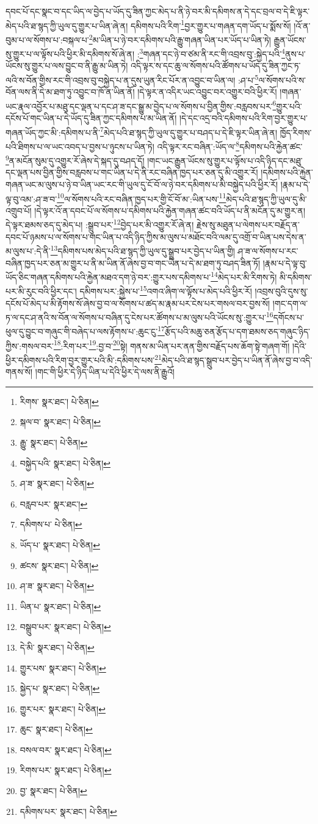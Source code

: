 དབང་པོ་དང་སྣང་བ་དང་ཡིད་ལ་བྱེད་པ་ཡོད་དུ་ཟིན་ཀྱང་མེད་པ་ནི་ཉེ་བར་མི་དམིགས་ན་དེ་དང་བྲལ་བ་དེ་ཇི་ལྟར་མེད་པའི་ཐ་སྙད་ཀྱི་ཡུལ་དུ་གྱུར་པ་ཡིན་ཞེ་ན། དམིགས་པའི་རིག་\footnote{རིགས་  སྣར་ཐང་།  པེ་ཅིན། }བྱར་གྱུར་པ་གཞན་དག་ཡོད་པ་སྨོས་སོ། །འོ་ན་བུམ་པ་ལ་སོགས་པ་:བསྐལ་པ་\footnote{སྐལ་བ་  སྣར་ཐང་།  པེ་ཅིན། }མ་ཡིན་པ་ཉེ་བར་དམིགས་པའི་རྒྱུ་གཞན་ཡིན་པར་ཡོད་པ་ཡིན་ཏེ། རྒྱུན་ཡོངས་སུ་གྱུར་པ་ལ་ལྟོས་པའི་ཕྱིར་མི་དམིགས་སོ་ཞེ་ན། :\footnote{རྒྱུ་  སྣར་ཐང་།  པེ་ཅིན། }གཞན་དང་ཉེ་བ་ཙམ་ནི་རང་གི་འབྲས་བུ་:སྐྱེད་པའི་\footnote{བསྐྱེད་པའི་  སྣར་ཐང་།  པེ་ཅིན། }ནུས་པ་ཡོངས་སུ་གྱུར་པ་ལས་བྱུང་བ་ནི་རྒྱུ་མ་ཡིན་ཏེ། འདི་ལྟར་ས་དང་ཆུ་ལ་སོགས་པའི་ཚོགས་པ་ཡོད་དུ་ཟིན་ཀྱང་ཏ་ལའི་ས་བོན་གྱིས་རང་གི་འབྲས་བུ་བསྐྱེད་པ་ན་དུས་ཡུན་རིང་པོར་ན་འབྱུང་བ་ཡིན་ལ། :ཤ་པ་\footnote{ཤ་ཟ་  སྣར་ཐང་།  པེ་ཅིན། }ལ་སོགས་པའི་ས་བོན་ལས་ནི་དེ་མ་ཐག་ཏུ་འབྱུང་བ་ཁོ་ན་ཡིན་ནོ། །དེ་ལྟར་ན་འདིར་ཡང་འབྱུང་བར་འགྱུར་བའི་ཕྱིར་རོ། །གཞན་ཡང་རྣལ་འབྱོར་པ་མཐུ་དང་ལྡན་པ་དང་ཤ་ཟ་དང་སྒྱུ་མ་བྱེད་པ་ལ་སོགས་པ་བྱིན་གྱིས་:བརླབས་པར་\footnote{བརླབ་པར་  སྣར་ཐང་། }གྱུར་པའི་དངོས་པོ་གང་ཡིན་པ་དེ་ཡོད་དུ་ཟིན་ཀྱང་དམིགས་པ་མ་ཡིན་ནོ། །དེ་དང་འདྲ་བའི་དམིགས་པའི་རིག་བྱར་གྱུར་པ་གཞན་ཡོད་ཀྱང་མི་:དམིགས་པ་ནི་\footnote{དམིགས་པ་  པེ་ཅིན། }མེད་པའི་ཐ་སྙད་ཀྱི་ཡུལ་དུ་གྱུར་པ་བཤད་པ་དེ་ཇི་ལྟར་ཡིན་ཞེ་ན། ཁྱོད་རིགས་པའི་ཐིགས་པ་ལ་ཡང་འབད་པ་བྱས་པ་ཉུངས་པ་ཡིན་ཏེ། འདི་ལྟར་རང་བཞིན་:ཡོད་ལ་\footnote{ཡོད་པ་  སྣར་ཐང་།  པེ་ཅིན། }དམིགས་པའི་རྐྱེན་ཚང་\footnote{ཚངས་  སྣར་ཐང་།  པེ་ཅིན། }ན་མངོན་སུམ་དུ་འགྱུར་རོ་ཞེས་དེ་སྐད་དུ་བཤད་དོ། །གང་ཡང་རྒྱུན་ཡོངས་སུ་གྱུར་པ་ལྟོས་པ་འདི་ཉིད་དང་མཐུ་དང་ལྡན་པས་བྱིན་གྱིས་བརླབས་པ་གང་ཡིན་པ་དེ་ནི་རང་བཞིན་ཁྱད་པར་ཅན་དུ་མི་འགྱུར་རོ། །དམིགས་པའི་རྐྱེན་གཞན་ཡང་མ་ལུས་པ་ཉེ་བ་ཡིན་ཡང་རང་གི་ཡུལ་དུ་ངོ་བོ་ལ་ཉེ་བར་དམིགས་པ་མི་བསྐྱེད་པའི་ཕྱིར་རོ། །རྣམ་པ་དེ་ལྟ་བུ་འམ་:ཤ་ཟ་བ་\footnote{ཤ་ཟ་  སྣར་ཐང་།  པེ་ཅིན། }ལ་སོགས་པའི་རང་བཞིན་ཁྱད་པར་གྱི་ངོ་བོ་མ་:ཡིན་པས་\footnote{ཡིན་པ་  སྣར་ཐང་།  པེ་ཅིན། }མེད་པའི་ཐ་སྙད་ཀྱི་ཡུལ་དུ་མི་འགྲུབ་པོ། །དེ་ལྟར་འོ་ན་དབང་པོ་ལ་སོགས་པ་དམིགས་པའི་རྐྱེན་གཞན་ཚང་བའི་ཡོད་པ་ནི་མངོན་དུ་མ་གྱུར་ན། དེ་ལྟར་ཐམས་ཅད་དུ་མེད་པ། :སྒྲུབ་པར་\footnote{བསྒྲུབ་པར་  སྣར་ཐང་།  པེ་ཅིན། }བྱེད་པར་མི་འགྱུར་རོ་ཞེ་ན། རྗེས་སུ་མཐུན་པ་ལེགས་པར་བརྗོད་ན་དབང་པོ་ཉམས་པ་ལ་སོགས་པ་གང་ཡིན་པ་འདི་ཉིད་ཀྱིས་མ་ལུས་པ་མཐོང་བའི་ལམ་དུ་འགྲོ་བ་ཡིན་པས་དེས་ན་མ་ལུས་པ་:དེ་ནི་\footnote{དེ་མི་  སྣར་ཐང་།  པེ་ཅིན། }དམིགས་པས་མེད་པའི་ཐ་སྙད་ཀྱི་ཡུལ་དུ་སྒྲུབ་པར་བྱེད་པ་ཡིན་གྱི། ཤ་ཟ་ལ་སོགས་པ་རང་བཞིན་ཁྱད་པར་ཅན་མ་གྱུར་པ་ནི་མ་ཡིན་ནོ་ཞེས་བྱ་བ་གང་ཡིན་པ་དེ་མ་ཐག་ཏུ་བཤད་ཟིན་ཏོ། །རྣམ་པ་དེ་ལྟ་བུ་ཡོད་ཅིང་གཞན་དམིགས་པའི་རྐྱེན་མཐའ་དག་ཉེ་བར་:གྱུར་པས་དམིགས་པ་\footnote{གྱུར་པས་  སྣར་ཐང་།  པེ་ཅིན། }མེད་པར་མི་རིགས་ཏེ། མི་དམིགས་པར་མི་རུང་བའི་ཕྱིར་དང་། དམིགས་པར་:སྐྱེས་པ་\footnote{སྐྱེད་པ་  སྣར་ཐང་།  པེ་ཅིན། }འགའ་ཞིག་ལ་ལྟོས་པ་མེད་པའི་ཕྱིར་རོ། །འབྲས་བུའི་དུས་སུ་དངོས་པོ་མེད་པ་མི་རྟོགས་སོ་ཞེས་བྱ་བ་ལ་སོགས་པ་ཚད་མ་རྣམ་པར་ངེས་པར་གསལ་བར་བྱས་སོ། །གང་དག་ལ་ཏ་ལ་དང་ཤ་ནའི་ས་བོན་ལ་སོགས་པ་བཞིན་དུ་ངེས་པར་ཚོགས་པ་མ་ལུས་པའི་ཡོངས་སུ་:གྱུར་པ་\footnote{གྱུར་པར་  སྣར་ཐང་།  པེ་ཅིན། }དགོངས་པ་ཕུལ་དུ་བྱུང་བ་གཞུང་གི་བཞེད་པ་ལས་རྟོགས་པ་:ཆུང་ངུ་\footnote{ཆུང་  སྣར་ཐང་།  པེ་ཅིན། }རྩོད་པའི་མཆུ་ཅན་རྩོད་པ་དག་ཐམས་ཅད་གཞུང་ཉིད་ཀྱིས་:གསལ་བར་\footnote{བསལ་བར་  སྣར་ཐང་།  པེ་ཅིན། }:རིག་པར་\footnote{རིགས་པར་  སྣར་ཐང་།  པེ་ཅིན། }:བྱ་བ་\footnote{བྱ་  སྣར་ཐང་།  པེ་ཅིན། }སྟེ། གནས་མ་ཡིན་པར་ནན་གྱིས་བརྗོད་པས་ཆོག་སྟེ་གཞག་གོ། །དེའི་ཕྱིར་དམིགས་པའི་རིག་བྱར་གྱུར་པའི་མི་:དམིགས་པས་\footnote{དམིགས་པར་  སྣར་ཐང་།  པེ་ཅིན། }མེད་པའི་ཐ་སྙད་སྒྲུབ་པར་བྱེད་པ་ཡིན་ནོ་ཞེས་བྱ་བ་འདི་གནས་སོ། །གང་གི་ཕྱིར་དེ་ཉིད་ཡིན་པ་དེའི་ཕྱིར་དེ་ལས་ནི་རྒྱུའོ། 